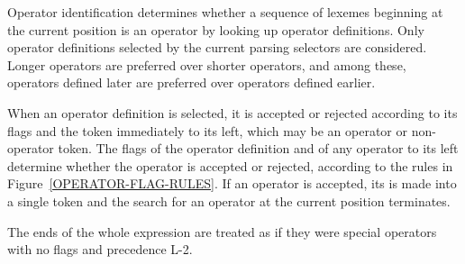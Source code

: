 \documentclass[12pt]{article}
\begin{document}
Operator identification determines whether a sequence of lexemes
beginning at the current position is an operator by looking up
operator definitions.  Only
operator definitions selected by the current parsing selectors are
considered.  Longer operators are preferred over shorter
operators, and among these, operators defined later are
preferred over operators defined earlier.

When an operator definition is selected, it is accepted or rejected
according to its flags and the token immediately to its left, which
may be an operator or non-operator token.  The flags of the operator
definition and of any operator to its left determine whether the
operator is accepted or rejected, according to the rules in
Figure~\ref{OPERATOR-FLAG-RULES}.  If an operator is accepted,
its is made into a single token and the search for an operator
at the current position terminates.

The ends of the whole expression are treated as if they were
special operators with no flags and precedence L-2.
\end{document}
